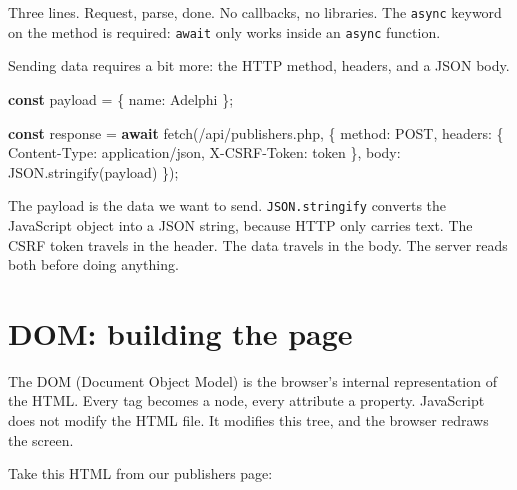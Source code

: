 \documentclass[11pt,a4paper,oneside]{book}
\newenvironment{Shaded}{\begin{snugshade}}{\end{snugshade}}
\newcommand{\KeywordTok}[1]{\textcolor[HTML]{007020}{\textbf{#1}}}
\newcommand{\DataTypeTok}[1]{\textcolor[HTML]{902000}{#1}}
\newcommand{\StringTok}[1]{\textcolor[HTML]{4070A0}{#1}}
\newcommand{\FunctionTok}[1]{\textcolor[HTML]{06287E}{#1}}
\newcommand{\ControlFlowTok}[1]{\textcolor[HTML]{007020}{\textbf{#1}}}
\newcommand{\OperatorTok}[1]{\textcolor[HTML]{666666}{#1}}
\newcommand{\BuiltInTok}[1]{#1}
\newcommand{\NormalTok}[1]{#1}
\begin{document}
Three lines. Request, parse, done. No callbacks, no libraries.
The \texttt{async} keyword on the method is required:
\texttt{await} only works inside an \texttt{async} function.

Sending data requires a bit more: the HTTP method, headers, and a
JSON body.

\begin{Shaded}
\begin{Highlighting}[]
\KeywordTok{const}\NormalTok{ payload }\OperatorTok{=}\NormalTok{ \{ }\DataTypeTok{name}\OperatorTok{:} \StringTok{\textquotesingle{}Adelphi\textquotesingle{}}\NormalTok{ \}}\OperatorTok{;}

\KeywordTok{const}\NormalTok{ response }\OperatorTok{=} \ControlFlowTok{await} \FunctionTok{fetch}\NormalTok{(}\StringTok{\textquotesingle{}/api/publishers.php\textquotesingle{}}\OperatorTok{,}\NormalTok{ \{}
    \DataTypeTok{method}\OperatorTok{:} \StringTok{\textquotesingle{}POST\textquotesingle{}}\OperatorTok{,}
    \DataTypeTok{headers}\OperatorTok{:}\NormalTok{ \{}
        \StringTok{\textquotesingle{}Content{-}Type\textquotesingle{}}\OperatorTok{:} \StringTok{\textquotesingle{}application/json\textquotesingle{}}\OperatorTok{,}
        \StringTok{\textquotesingle{}X{-}CSRF{-}Token\textquotesingle{}}\OperatorTok{:}\NormalTok{ token}
\NormalTok{    \}}\OperatorTok{,}
    \DataTypeTok{body}\OperatorTok{:} \BuiltInTok{JSON}\OperatorTok{.}\FunctionTok{stringify}\NormalTok{(payload)}
\NormalTok{\})}\OperatorTok{;}
\end{Highlighting}
\end{Shaded}

The payload is the data we want to send. \texttt{JSON.stringify}
converts the JavaScript object into a JSON string, because HTTP
only carries text. The CSRF token travels in the header. The data
travels in the body. The server reads both before doing anything.

\hypertarget{dom-building-the-page}{%
\section{DOM: building the page}\label{dom-building-the-page}}

The DOM (Document Object Model) is the browser's internal
representation of the HTML. Every tag becomes a node, every
attribute a property. JavaScript does not modify the HTML file.
It modifies this tree, and the browser redraws the screen.

Take this HTML from our publishers page:
\end{document}
